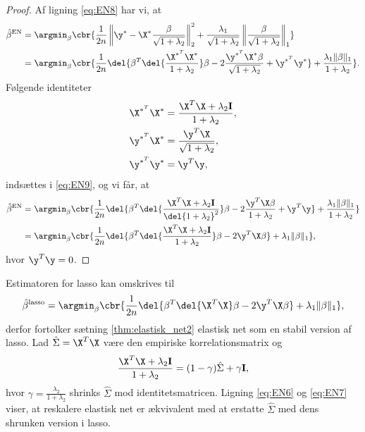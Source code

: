 \begin{proof}
Af ligning \eqref{eq:EN8} har vi, at
\begin{align}
\hat{\beta}^\text{EN} &= \argmin_{\beta} \cbr{\frac{1}{2n} \left\Vert \y^* - \X^* \frac{\beta}{\sqrt{1+\lambda_2}} \right\Vert_2^2 + \frac{\lambda_1}{\sqrt{1+\lambda_2}} \left\Vert \frac{\beta}{\sqrt{1+\lambda_2}} \right\Vert_1} \nonumber \\
&=\argmin_{\beta} \cbr{\frac{1}{2n} \del{\beta^T \del{\frac{\X^{*^T} \X^*}{1+\lambda_2}} \beta - 2 \frac{\y^{*^T} \X^* \beta}{\sqrt{1+\lambda_2}} + \y^{*^T} \y^*} + \frac{\lambda_1 \Vert \beta \Vert_1}{1+\lambda_2}}. \label{eq:EN9}
\end{align}
Følgende identiteter
\begin{align*}
\X^{*^T} \X^* &= \frac{\X^T \X + \lambda_2 \mathbf{I}}{1+ \lambda_2}, \\
\y^{*^T} \X^* &= \frac{\y^T \X}{\sqrt{1+\lambda_2}} ,\\
\y^{*^T} \y^* &= \y^T \y, 
\end{align*}
indsættes i \eqref{eq:EN9}, og vi får, at
\begin{align*}
\hat{\beta}^\text{EN} &= \argmin_{\beta} \cbr{\frac{1}{2n} \del{\beta^T \del{\frac{\X^T \X + \lambda_2 \mathbf{I}}{\del{1+\lambda_2}^2}} \beta - 2 \frac{\y^T \X \beta}{1+\lambda_2} + \y^T \y} + \frac{\lambda_1 \Vert \beta \Vert_1}{1+\lambda_2}} \\ 
&= \argmin_{\beta} \cbr{ \frac{1}{2n} \del{\beta^T \del{\frac{\X^T \X + \lambda_2 \mathbf{I}}{1+ \lambda_2}} \beta - 2 \y^T \X \beta} + \lambda_1 \Vert \beta \Vert_1},
\end{align*}
hvor \(\y^T \y= 0 \).
\end{proof}
%
Estimatoren for lasso kan omskrives til
\begin{align}
\hat{\beta}^\text{lasso} = \argmin_\beta \cbr{ \frac{1}{2n} \del{ \beta^T \del{\X^T \X} \beta - 2 \y^T \X \beta } + \lambda_1 \Vert \beta \Vert_1}, \label{eq:EN7}
\end{align}
derfor fortolker sætning \ref{thm:elastisk_net2} elastisk net som en stabil version af lasso.
Lad \(\hat{\Sigma} = \X^T \X\) være den empiriske korrelationsmatrix og
\begin{align*}
\frac{\X^T \X + \lambda_2 \mathbf{I}}{1 + \lambda_2} = (1-\gamma) \hat{\Sigma} + \gamma \mathbf{I},
\end{align*}
hvor \(\gamma=\frac{\lambda_2}{1+\lambda_2}\) shrinks \(\hat{\Sigma}\) mod identitetsmatricen.
Ligning \eqref{eq:EN6} og \eqref{eq:EN7} viser, at reskalere elastisk net er ækvivalent med at erstatte \(\hat{\Sigma}\) med dens shrunken version i lasso.


